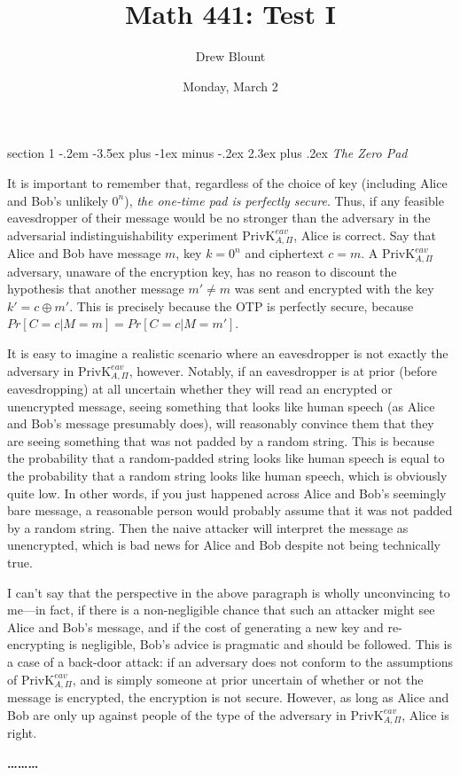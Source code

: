 \documentclass[12pt]{article}
\makeatletter
\newenvironment{problem}{\@startsection
       {section}
       {1}
       {-.2em}
       {-3.5ex plus -1ex minus -.2ex}
       {2.3ex plus .2ex}
       {\pagebreak[3]%
       \large\bf\noindent{Problem }
       }
       }
       {%
       \begin{center}\large\bf \ldots\ldots\ldots\end{center}}
\makeatother
\begin{document}
\title{Math 441: Test I}
\author{Drew Blount}
\date{Monday, March 2}

\maketitle

\thispagestyle{empty}

\begin{problem}{\it The Zero Pad}

It is important to remember that, regardless of the choice of key (including Alice and Bob's unlikely $0^n$), \emph{the one-time pad is perfectly secure}. Thus, if any feasible eavesdropper of their message would be no stronger than the adversary in the adversarial indistinguishability experiment $\text{PrivK}^{eav}_{A,\Pi}$, Alice is correct. Say that Alice and Bob have message $m$, key $k=0^n$ and ciphertext $c=m$. A $\text{PrivK}^{eav}_{A,\Pi}$ adversary, unaware of the encryption key, has no reason to discount the hypothesis that another message $m'\ne m$ was sent and encrypted with the key $k'=c\oplus m'$. This is precisely because the OTP is perfectly secure, because $Pr[C=c|M=m]=Pr[C=c|M=m']$.

It is easy to imagine a realistic scenario where an eavesdropper is not exactly the adversary in $\text{PrivK}^{eav}_{A,\Pi}$, however. Notably, if an eavesdropper is at prior (before eavesdropping) at all uncertain whether they will read an encrypted or unencrypted message, seeing something that looks like human speech (as Alice and Bob's message presumably does), will reasonably convince them that they are seeing something that was not padded by a random string. This is because the probability that a random-padded string looks like human speech is equal to the probability that a random string looks like human speech, which is obviously quite low. In other words, if you just happened across Alice and Bob's seemingly bare message, a reasonable person would probably assume that it was not padded by a random string. Then the naive attacker will interpret the message as unencrypted, which is bad news for Alice and Bob despite not being technically true.

I can't say that the perspective in the above paragraph is wholly unconvincing to me---in fact, if there is a non-negligible chance that such an attacker might see Alice and Bob's message, and if the cost of generating a new key and re-encrypting is negligible, Bob's advice is pragmatic and should be followed. This is a case of a back-door attack: if an adversary does not conform to the assumptions of $\text{PrivK}^{eav}_{A,\Pi}$, and is simply someone at prior uncertain of whether or not the message is encrypted, the encryption is not secure. However, as long as Alice and Bob are only up against people of the type of the adversary in $\text{PrivK}^{eav}_{A,\Pi}$, Alice is right.


\end{problem}
\end{document}
